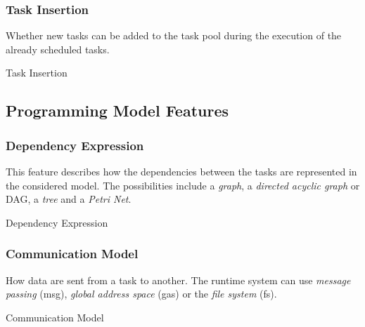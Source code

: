 \subsubsection{Task Insertion}
Whether new tasks can be added to the task pool during the execution of the already scheduled tasks.
\begin{table}[H]
	\caption{Task Insertion}
	\centering
	\begin{multicols}{2}
		

		
	\end{multicols}
\end{table}

\subsection{Programming Model Features}
\subsubsection{Dependency Expression}
This feature describes how the dependencies between the tasks are represented in the considered model.
The possibilities include a \textit{graph}, a \textit{directed acyclic graph} or DAG, a \textit{tree} and a \textit{Petri Net}.
\begin{table}[H]
	\caption{Dependency Expression}
	\centering
	\begin{multicols}{2}
		

		
	\end{multicols}
\end{table}


\subsubsection{Communication Model}
How data are sent from a task to another.
The runtime system can use \textit{message passing} (msg), \textit{global address space} (gas) or the \textit{file system} (fs).
\begin{table}[H]
	\caption{Communication Model}
	\centering
	\begin{multicols}{2}
		

		
	\end{multicols}
\end{table}

